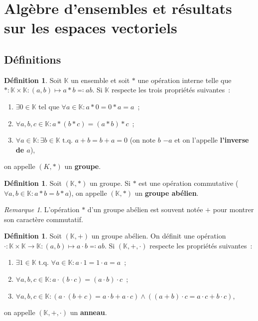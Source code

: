 \documentclass{article}
\newcommand{\K}{\mathbb K}
\newcommand{\tq}{\textrm{ t.q. }}
\theoremstyle{definition}
\newtheorem{déf}[thm]{Définition}
\theoremstyle{remark}
\newtheorem*{rmq}{Remarque}
\begin{document}
\newpage
\section{Algèbre d'ensembles et résultats sur les espaces vectoriels}
	\subsection{Définitions}
		\begin{déf} Soit $\K$ un ensemble et soit $*$ une opération interne telle que $* : \K \times \K : (a, b) \mapsto a*b \eqqcolon ab$. Si $\K$ respecte les
		trois propriétés suivantes~:

		\begin{enumerate}
			\item $\exists 0 \in \K$ tel que $\forall a \in \K : a * 0 = 0 * a = a$~;
			\item $\forall a, b, c \in \K : a * (b*c) = (a*b) * c$~;
			\item $\forall a \in \K : \exists b \in \K \tq a + b = b + a = 0$ (on note $b$ $-a$ et on l'appelle \textbf{l'inverse de $a$}),
		\end{enumerate}
		on appelle $(K, *)$ un \textbf{groupe}.\end{déf}

		\begin{déf} Soit $(\K, *)$ un groupe. Si $*$ est une opération commutative ($\forall a, b \in \K : a * b = b * a$), on appelle $(\K, *)$ un
		\textbf{groupe abélien}. \end{déf}

		\begin{rmq} L'opération $*$ d'un groupe abélien est souvent notée $+$ pour montrer son caractère commutatif. \end{rmq}

		\begin{déf} Soit $(\K, +)$ un groupe abélien. On définit une opération $\cdot : \K \times \K \to \K : (a, b) \mapsto a \cdot b \eqqcolon ab$.
		Si $(\K, +, \cdot)$ respecte les propriétés suivantes~:

		\begin{enumerate}
			\item $\exists 1 \in \K \tq \forall a \in \K : a \cdot 1 = 1 \cdot a = a$~;
			\item $\forall a, b, c \in \K : a \cdot (b \cdot c) = (a \cdot b) \cdot c$~;
			\item $\forall a, b, c \in \K : (a \cdot (b + c) = a \cdot b + a \cdot c) \land ((a + b) \cdot c = a \cdot c + b \cdot c)$,
		\end{enumerate}
		on appelle $(\K, +, \cdot)$ un \textbf{anneau}. \end{déf}
\end{document}
